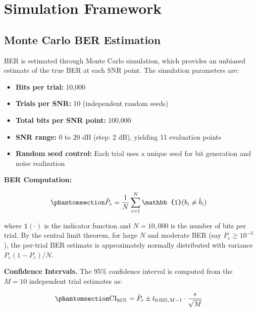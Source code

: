 \section{Simulation Framework}\label{sec:simulation-framework}

\subsection{Monte Carlo BER Estimation}\label{sec:monte-carlo-ber-estimation}

BER is estimated through Monte Carlo simulation, which provides an unbiased estimate of the true BER at each SNR point. The simulation parameters are:

\begin{itemize}
\tightlist
\item
  \textbf{Bits per trial:} 10,000
\item
  \textbf{Trials per SNR:} 10 (independent random seeds)
\item
  \textbf{Total bits per SNR point:} 100,000
\item
  \textbf{SNR range:} 0 to 20 dB (step: 2 dB), yielding 11 evaluation points
\item
  \textbf{Random seed control:} Each trial uses a unique seed for bit generation and noise realization
\end{itemize}

\textbf{BER Computation:}

\begin{equation}\protect\phantomsection\label{eq:ber-estimate}{\hat{P}_e = \frac{1}{N}\sum_{i=1}^{N} \mathbb{1}(b_i \neq \hat{b}_i)
}\end{equation}

where \(\mathbb{1}(\cdot)\) is the indicator function and \(N = 10{,}000\) is the number of bits per trial. By the central limit theorem, for large \(N\) and moderate BER (say \(P_e \geq 10^{-3}\)), the per-trial BER estimate is approximately normally distributed with variance \(P_e(1-P_e)/N\).

\textbf{Confidence Intervals.} The 95\% confidence interval is computed from the \(M = 10\) independent trial estimates as:

\begin{equation}\protect\phantomsection\label{eq:confidence-interval}{\text{CI}_{95\%} = \bar{P}_e \pm t_{0.025, M-1} \cdot \frac{s}{\sqrt{M}}
}\end{equation}


